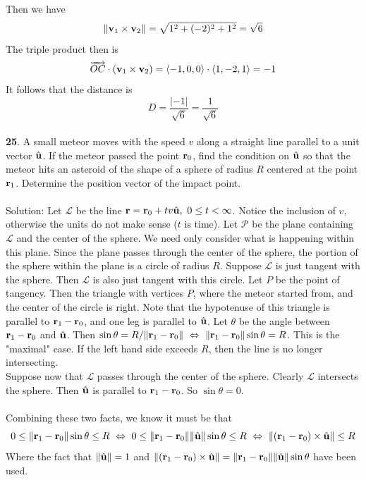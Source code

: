 \documentclass[12pt]{amsbook}
\newcommand{\la}{\langle}
\newcommand{\ra}{\rangle}
\begin{document}
Then we have
$$\|{\bf v}_1\times{\bf v}_2\|=\sqrt{1^2+(-2)^2+1^2}=\sqrt{6}$$
The triple product then is
$$\overrightarrow{OC}\cdot({\bf v}_1\times{\bf v}_2)=\la -1,0,0 \ra\cdot\la 1,-2,1\ra = -1$$
It follows that the distance is
$$D=\frac{|-1|}{\sqrt{6}}=\frac{1}{\sqrt{6}}$$
\\
{\small\bf 25}. A small meteor moves with the speed $v$ 
along a straight line parallel to a unit
vector $\hat{\bf u}$. If the meteor passed the point 
${\bf r}_0$, find the condition on $\hat{\bf u}$
so that the meteor hits an asteroid of the shape 
of a sphere of radius $R$ centered at the point
${\bf r}_1$. Determine the position vector of the 
impact point.\\
\\
{\sc Solution}: Let $\mathcal{L}$ be the line ${\bf r}={\bf r}_0+tv\hat{\bf u}, \ 0\leq t < \infty$. Notice the inclusion of $v$, otherwise the units do not make sense ($t$ is  time). Let $\mathcal{P}$ be the plane containing $\mathcal{L}$ and the center of the sphere. We need only consider what is happening within this plane. Since the plane passes through the center of the sphere, the portion of the sphere within the plane is a circle of radius $R$. Suppose $\mathcal{L}$ is just tangent with the sphere. Then $\mathcal{L}$ is also just tangent with this circle. Let $P$ be the point of tangency. Then the triangle with vertices $P$, where the meteor started from, and the center of the circle is right. Note that the hypotenuse of this triangle is parallel to ${\bf r}_1-{\bf r}_0$, and one leg is parallel to $\hat{\bf u}$. Let $\theta$ be the angle between  ${\bf r}_1-{\bf r}_0$ and $\hat{\bf u}$. Then $\sin\theta=R/\|{\bf r}_1-{\bf r}_0\| \ \Leftrightarrow 
\ \|{\bf r}_1-{\bf r}_0\|\sin\theta=R$. This is the "maximal" case. If the left hand side exceeds $R$, then the line is no longer intersecting.
\\
Suppose now that $\mathcal{L}$ passes through the center of the sphere. Clearly $\mathcal{L}$ intersects the sphere. Then $\hat{\bf u}$ is parallel to ${\bf r}_1-{\bf r}_0$. So $\sin\theta=0$. 
\\
\\
Combining these two facts, we know it must be that
$$0\leq  \|{\bf r}_1-{\bf r}_0\|\sin\theta \leq R \ \Leftrightarrow \ 0\leq  \|{\bf r}_1-{\bf r}_0\|\|\hat{\bf u}\|\sin\theta \leq R \ \Leftrightarrow \   \|({\bf r}_1-{\bf r}_0)\times\hat{\bf u}\| \leq R $$
Where the fact that $\|\hat{\bf u}\|=1$ and $\|({\bf r}_1-{\bf r}_0)\times\hat{\bf u}\|=\|{\bf r}_1-{\bf r}_0\|\|\hat{\bf u}\|\sin\theta$ have been used.
\end{document}
